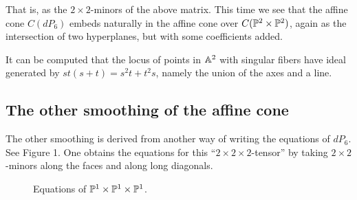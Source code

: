 \documentclass[11pt, english]{article}
\begin{document}
That is, as the $2 \times 2$-minors of the above matrix. This time we see that the affine cone $C(dP_6)$ embeds naturally in the affine cone over $C(\mathbb{P}^2 \times \mathbb{P}^2)$, again as the intersection of two hyperplanes, but with some coefficients added.

It can be computed that the locus of points in $\mathbb{A}^2$ with singular fibers have ideal generated by $st(s+t)=s^2t+t^2s$, namely the union of the axes and a line.

\subsection{The other smoothing of the affine cone}

The other smoothing is derived from another way of writing the equations of $dP_6$. See Figure 1. One obtains the equations for this ``$2 \times 2 \times 2$-tensor'' by taking $2 \times 2$-minors along the faces and along long diagonals.





\begin{figure}
\centering 
  \caption{Equations of $\mathbb{P}^1 \times \mathbb{P}^1 \times \mathbb{P}^1$.}
\end{figure}
\end{document}
